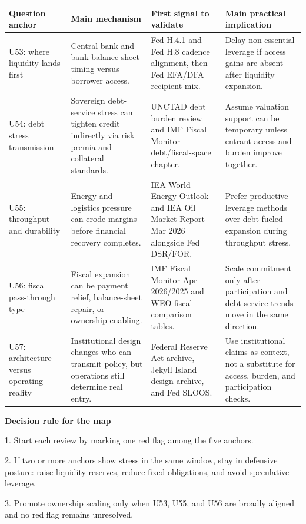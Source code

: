 \documentclass[11pt,openany]{book}
\begin{document}
\begin{center}
\small
\begin{tabularx}{\textwidth}{>{\raggedright\arraybackslash}p{}>{\raggedright\arraybackslash}p{}>{\raggedright\arraybackslash}p{}X}
\toprule
\textbf{Question anchor} & \textbf{Main mechanism} & \textbf{First signal to validate} & \textbf{Main practical implication} \\
\midrule
U53: where liquidity lands first & Central-bank and bank balance-sheet timing versus borrower access. & Fed H.4.1 and Fed H.8 cadence alignment, then Fed EFA/DFA recipient mix. & Delay non-essential leverage if access gains are absent after liquidity expansion. \\
U54: debt stress transmission & Sovereign debt-service stress can tighten credit indirectly via risk premia and collateral standards. & UNCTAD debt burden review and IMF Fiscal Monitor debt/fiscal-space chapter. & Assume valuation support can be temporary unless entrant access and burden improve together. \\
U55: throughput and durability & Energy and logistics pressure can erode margins before financial recovery completes. & IEA World Energy Outlook and IEA Oil Market Report Mar 2026 alongside Fed DSR/FOR. & Prefer productive leverage methods over debt-fueled expansion during throughput stress. \\
U56: fiscal pass-through type & Fiscal expansion can be payment relief, balance-sheet repair, or ownership enabling. & IMF Fiscal Monitor Apr 2026/2025 and WEO fiscal comparison tables. & Scale commitment only after participation and debt-service trends move in the same direction. \\
U57: architecture versus operating reality & Institutional design changes who can transmit policy, but operations still determine real entry. & Federal Reserve Act archive, Jekyll Island design archive, and Fed SLOOS. & Use institutional claims as context, not a substitute for access, burden, and participation checks. \\
\bottomrule
\end{tabularx}
\normalsize
\end{center}

\begin{notebox}
\textbf{Decision rule for the map}\par
1. Start each review by marking one red flag among the five anchors.\par
2. If two or more anchors show stress in the same window, stay in defensive posture: raise liquidity reserves, reduce fixed obligations, and avoid speculative leverage.\par
3. Promote ownership scaling only when U53, U55, and U56 are broadly aligned and no red flag remains unresolved.
\end{notebox}
\end{document}
